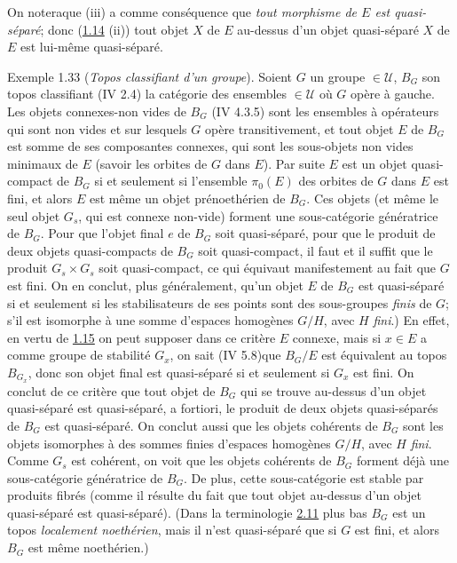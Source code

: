 \documentclass[10pt]{../fichiers-configuration-latex/smfart}
\begin{document}
On notera\pageoriginale que (iii) a comme conséquence que \emph{tout
  morphisme de
  $E$ est quasi-séparé}; donc (\hyperref[VI.prop1.14]{1.14} (ii)) tout objet $X$ de $E$
  au-dessus d'un objet quasi-séparé $X$ de $E$ est lui-même
  quasi-séparé.

\begin{enonce*}[remark]{Exemple 1.33}
(\emph{Topos classifiant d'un groupe}). Soient $G$ un groupe $\in
𝒰$, $B_G$ son topos classifiant (IV 2.4) \ie la catégorie
des ensembles $\in 𝒰$ où $G$ opère à gauche. Les objets
connexes-non vides de $B_G$ (IV 4.3.5) sont les ensembles à
opérateurs qui sont non vides et sur lesquels $G$ opère
transitivement, et tout objet $E$ de $B_G$ est somme de ses
composantes connexes, qui sont les sous-objets non vides minimaux de
$E$ (savoir les orbites de $G$ dans $E$). Par suite $E$ est un objet
quasi-compact de $B_G$ si et seulement si l'ensemble $\pi_0(E)$ des
orbites de $G$ dans $E$ est fini, et alors $E$ est même un objet
prénoethérien de $B_G$. Ces objets (et même le seul objet $G_s$, qui
est connexe non-vide) forment une sous-catégorie génératrice de
$B_G$. Pour que l'objet final $e$ de $B_G$ soit quasi-séparé, \ie
pour que le produit de deux objets quasi-compacts de $B_G$ soit
quasi-compact, il faut et il suffit que le produit $G_s\times G_s$
soit quasi-compact, ce qui équivaut manifestement au fait que $G$
est fini. On en conclut, plus généralement, qu'un objet $E$ de $B_G$
est quasi-séparé si et seulement si les stabilisateurs de ses points
sont des sous-groupes \emph{finis} de $G$; \ie s'il est isomorphe à
une somme d'espaces homogènes $G/H$, avec $H$ \emph{fini}.) En
effet, en vertu de \hyperref[VI.cor1.15]{1.15} on peut supposer dans ce critère
$E$ connexe, mais si $x \in E$ a comme groupe de stabilité $G_x$, on
sait (IV 5.8)\pageoriginale que $B_G / E$ est équivalent au topos
$B_{G_x}$, donc son objet final est quasi-séparé si et seulement si
$G_x$ est fini. On conclut de ce critère que tout objet de $B_G$ qui
se trouve au-dessus d'un objet quasi-séparé est quasi-séparé, a
fortiori, le produit de deux objets quasi-séparés de $B_G$ est
quasi-séparé. On conclut aussi que les objets cohérents de $B_G$
sont les objets isomorphes à des sommes finies d'espaces homogènes
$G/H$, avec $H$ \emph{fini}. Comme $G_s$ est cohérent, on voit que
les objets cohérents de $B_G$ forment déjà une sous-catégorie
génératrice de $B_G$. De plus, cette sous-catégorie est stable par
produits fibrés (comme il résulte du fait que tout objet au-dessus
d'un objet quasi-séparé est quasi-séparé). (Dans la terminologie
\hyperref[VI.def2.11]{2.11} plus bas $B_G$ est un topos \emph{localement
noethérien}, mais il n'est quasi-séparé que si $G$ est fini, et
alors $B_G$ est même noethérien.)


\end{enonce*}
\end{document}

